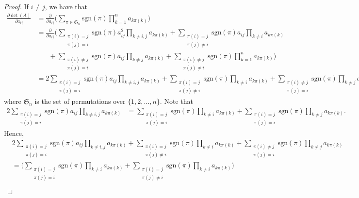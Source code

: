 \documentclass[10pt]{article}
\newcommand{\sgn}{\mathrm{sgn}}
\begin{document}
\begin{itemize}
\begin{proof}
      If $i \neq j$, we have that
      \begin{align*}
        \frac{\partial \det(A)}{\partial a_{ij}} 
        &= \frac{\partial}{\partial a_{ij}} \bigg( \sum_{\pi \in \mathfrak{S}_n} \sgn(\pi) \prod_{k=1}^n a_{k\pi(k)} \bigg)\\
        &= \frac{\partial}{\partial a_{ij}} \bigg( \sum_{\substack{\pi(i) = j\\\pi(j)=i}} \sgn(\pi) a_{ij}^2 \prod_{k\neq i,j} a_{k\pi(k)} 
        + \sum_{\substack{\pi(i) = j\\\pi(j)\neq i}} \sgn(\pi) a_{ij} \prod_{k\neq i} a_{k\pi(k)}\\
        &\phantom{\ = \ } + \sum_{\substack{\pi(i) \neq j\\\pi(j) =  i}} \sgn(\pi) a_{ij} \prod_{k\neq j} a_{k\pi(k)} +  \sum_{\substack{\pi(i) \neq j\\\pi(j) \neq  i}} \sgn(\pi) \prod_{k = 1}^n a_{k\pi(k)} \bigg)\\
        &= 2 \sum_{\substack{\pi(i) = j\\\pi(j) =  i}} \sgn(\pi) a_{ij} \prod_{k\neq i,j} a_{k\pi(k)} + \sum_{\substack{\pi(i) = j\\\pi(j)\neq i}} \sgn(\pi) \prod_{k\neq i} a_{k\pi(k)} + \sum_{\substack{\pi(i) \neq j\\\pi(j) =  i}} \sgn(\pi) \prod_{k\neq j} a_{k\pi(k)}.
      \end{align*}
      where $\mathfrak{S}_n$ is the set of permutations over $\{1,2,\dotsc,n\}$. Note that
      \begin{align*}
        2 \sum_{\substack{\pi(i) = j\\\pi(j) =  i}} \sgn(\pi) a_{ij} \prod_{k\neq i,j} a_{k\pi(k)}
        &= \sum_{\substack{\pi(i) = j\\\pi(j) =  i}} \sgn(\pi) \prod_{k\neq i} a_{k\pi(k)} + \sum_{\substack{\pi(i) = j\\\pi(j) =  i}} \sgn(\pi) \prod_{k\neq j} a_{k\pi(k)}.
      \end{align*}
      Hence,
      \begin{align*}
      &2 \sum_{\substack{\pi(i) = j\\\pi(j) =  i}} \sgn(\pi) a_{ij} \prod_{k\neq i,j} a_{k\pi(k)} + \sum_{\substack{\pi(i) = j\\\pi(j)\neq i}} \sgn(\pi) \prod_{k\neq i} a_{k\pi(k)} + \sum_{\substack{\pi(i) \neq j\\\pi(j) =  i}} \sgn(\pi) \prod_{k\neq j} a_{k\pi(k)}\\
      &= \bigg( \sum_{\substack{\pi(i) = j\\\pi(j) =  i}} \sgn(\pi) \prod_{k\neq i} a_{k\pi(k)} + \sum_{\substack{\pi(i) = j\\\pi(j)\neq i}} \sgn(\pi) \prod_{k\neq i} a_{k\pi(k)} \bigg)\\

\end{align*}
\end{proof}
\end{itemize}
\end{document}
